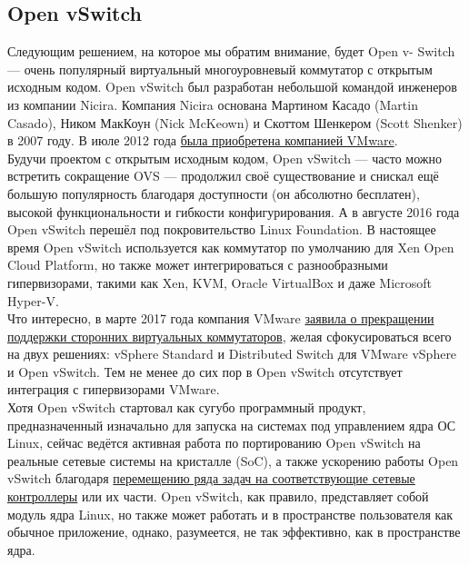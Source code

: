 \documentclass[14pt, a4paper]{article}
\begin{document}
\subsection*{Open vSwitch} 

Следующим решением, на которое мы обратим внимание, будет Open v- Switch — очень популярный
виртуальный многоуровневый коммутатор с открытым исходным кодом. Open vSwitch был разработан
небольшой командой инженеров из компании Nicira. Компания Nicira основана Мартином Касадо
(Martin Casado), Ником МакКоун (Nick McKeown) и Скоттом Шенкером (Scott Shenker) в 2007 году. В
июле 2012 года \href{https://news.vmware.com/releases/vmware-to-acquire-nicira}{была приобретена компанией VMware}.\\

Будучи проектом с открытым исходным кодом, Open vSwitch — часто можно встретить сокращение
OVS — продолжил своё существование и снискал ещё большую популярность благодаря доступности
(он абсолютно бесплатен), высокой функциональности и гибкости конфигурирования. А в августе 2016
года Open vSwitch перешёл под покровительство Linux Foundation.
В настоящее время Open vSwitch используется как коммутатор по умолчанию для Xen Open Cloud
Platform, но также может интегрироваться с разнообразными гипервизорами, такими как Xen, KVM,
Oracle VirtualBox и даже Microsoft Hyper-V.\\

Что интересно, в марте 2017 года компания VMware \href{https://blogs.vmware.com/networkvirtualization/2017/03/native-vswitch.html/}{заявила о прекращении поддержки сторонних
виртуальных коммутаторов}, желая сфокусироваться всего на двух решениях: vSphere Standard и
Distributed Switch для VMware vSphere и Open vSwitch. Тем не менее до сих пор в Open vSwitch
отсутствует интеграция с гипервизорами VMware.\\

Хотя Open vSwitch стартовал как сугубо программный продукт, предназначенный изначально для
запуска на системах под управлением ядра ОС Linux, сейчас ведётся активная работа по
портированию Open vSwitch на реальные сетевые системы на кристалле (SoC), а также ускорению
работы Open vSwitch благодаря \href{https://www.netronome.com/m/documents/WP_Netronome_25GbE_SmartNICs_with_Open_vSwitch_Hardware_Offload.pdf}{перемещению ряда задач на соответствующие сетевые контроллеры}
или их части. Open vSwitch, как правило, представляет собой модуль ядра Linux, но также может
работать и в пространстве пользователя как обычное приложение, однако, разумеется, не так
эффективно, как в пространстве ядра.\\
\end{document}
